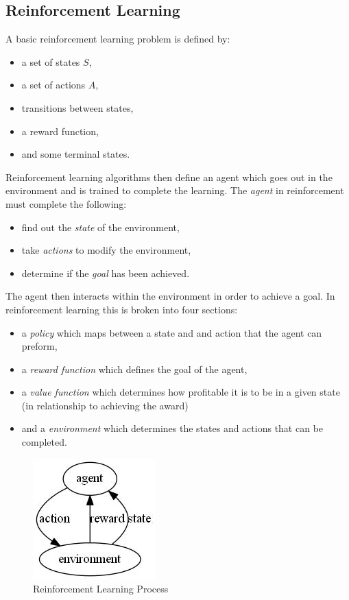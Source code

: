\documentclass[conference]{IEEEtran}
\begin{document}
\subsection{Reinforcement Learning}
A basic reinforcement learning problem is defined by\cite{poliscuk_adaptive_2002}:
\begin{itemize}
    \item a set of states $S$,
    \item a set of actions $A$,
    \item transitions between states,
    \item a reward function,
    \item and some terminal states.
\end{itemize}
Reinforcement learning algorithms then define an agent which goes out in the environment and is trained to complete the learning. 
The \emph{agent} in reinforcement must complete the following\cite{poliscuk_adaptive_2002}:
\begin{itemize}
	\item find out the \emph{state} of the environment,
	\item take \emph{actions} to modify the environment,
	\item determine if the \emph{goal} has been achieved.
\end{itemize}
The agent then interacts within the environment in order to achieve a goal.  In reinforcement learning this is broken into four sections:
\begin{itemize}
	\item a \emph{policy} which maps between a state and and action that the agent can preform,
	\item a \emph{reward function} which defines the goal of the agent,
	\item a \emph{value function} which determines how profitable it is to be in a given state (in relationship to achieving the award)
	\item and a \emph{environment} which determines the states and actions that can be completed.
\end{itemize}

\begin{figure}
\centering
\includegraphics[]{RLDiagram}
\caption{Reinforcement Learning Process}
\label{RLDiagram}
\end{figure}
\end{document}
